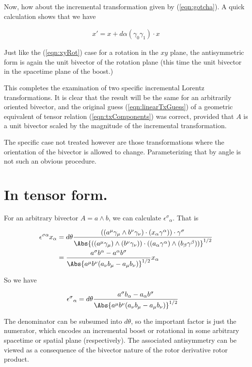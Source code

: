 Now, how about the incremental transformation given by (\ref{eqn:gotcha}).  A quick calculation shows that we have

\begin{align}\label{eqn:xLor}
x' = x + d\alpha (\gamma_0 \gamma_1) \cdot x
\end{align}

Just like the (\ref{eqn:xyRot}) case for a rotation in the $x y$ plane, the antisymmetric form is again the unit bivector of the rotation plane (this time the unit bivector in the spacetime plane of the boost.)

This completes the examination of two specific incremental Lorentz transformations.  It is clear that the result will be the same for an arbitrarily oriented bivector, and the original guess (\ref{eqn:linearTxGuess}) of a geometric equivalent of tensor relation (\ref{eqn:txComponents}) was correct, provided that $A$ is a unit bivector scaled by the magnitude of the incremental transformation.

The specific case not treated however are those transformations where the orientation of the bivector is allowed to change.  Parameterizing that by angle is not such an obvious procedure.

\section{In tensor form.}

For an arbitrary bivector $A = a \wedge b$, we can calculate ${\epsilon^\sigma}_\alpha$.  That is

\begin{align*}
\epsilon^{\sigma\alpha} x_\alpha
&=
d\theta
\frac
{
((a^\mu \gamma_\mu \wedge b^\nu \gamma_\nu) \cdot ( x_\alpha \gamma^\alpha)) \cdot \gamma^\sigma 
}
{\Abs{((a^\mu \gamma_\mu) \wedge (b^\nu \gamma_\nu)) \cdot ((a_\alpha \gamma^\alpha) \wedge (b_\beta \gamma^\beta))}^{1/2}} 
\\
&=
\frac{ a^\sigma b^\alpha - a^\alpha b^\sigma }{\Abs{a^\mu b^\nu( a_\nu b_\mu - a_\mu b_\nu)}^{1/2}} x_\alpha \\
\end{align*}

So we have

\begin{align*}
{\epsilon^\sigma}_\alpha
&=
d\theta
\frac{ a^\sigma b_\alpha - a_\alpha b^\sigma }{\Abs{a^\mu b^\nu( a_\nu b_\mu - a_\mu b_\nu)}^{1/2}} 
\end{align*}

The denominator can be subsumed into $d\theta$, so the important factor is just the numerator, which encodes an incremental boost or rotational in some arbitrary spacetime or spatial plane (respectively).  The associated antisymmetry can be viewed as a consequence of the bivector nature of the rotor derivative rotor product.

\EndArticle
